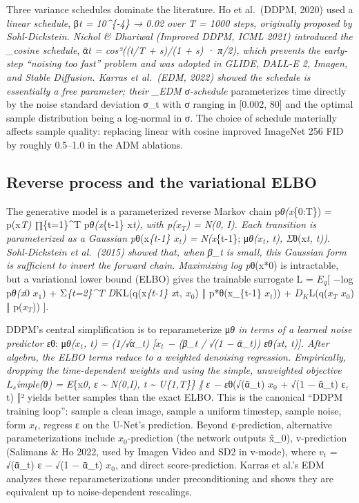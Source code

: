 Three variance schedules dominate the literature. Ho et al.~(DDPM, 2020) used a \emph{linear schedule}, β\emph{t = 10\^{}\{-4\} → 0.02 over T = 1000 steps, originally proposed by Sohl-Dickstein. Nichol \& Dhariwal (Improved DDPM, ICML 2021) introduced the \_cosine schedule}, ᾱ\emph{t = cos²((t/T + s)/(1 + s) · π/2), which prevents the early-step ``noising too fast'' problem and was adopted in GLIDE, DALL-E 2, Imagen, and Stable Diffusion. Karras et al.~(EDM, 2022) showed the schedule is essentially a free parameter; their \_EDM σ-schedule} parameterizes time directly by the noise standard deviation σ\_t with σ ranging in {[}0.002, 80{]} and the optimal sample distribution being a log-normal in σ. The choice of schedule materially affects sample quality: replacing linear with cosine improved ImageNet 256 FID by roughly 0.5--1.0 in the ADM ablations.

\subsection{Reverse process and the variational ELBO}\label{reverse-process-and-the-variational-elbo}

The generative model is a parameterized reverse Markov chain p\emph{θ(x}\{0:T\}) = p(x\emph{T) ∏}\{t=1\}\^{}T p\emph{θ(x}\{t-1\} \textbar{} x\emph{t), with p(\(x_T\)) = N(0, I). Each transition is parameterized as a Gaussian p}θ(x\emph{\{t-1\} \textbar{} \(x_t\)) = N(x}\{t-1\}; μ\emph{θ(\(x_t\), t), Σ}θ(x\emph{t, t)). Sohl-Dickstein et al.~(2015) showed that, when β\_t is small, this Gaussian form is sufficient to invert the forward chain. Maximizing log p}θ(x*0) is intractable, but a variational lower bound (ELBO) gives the trainable surrogate L = \(E_q\){[} −log p\emph{θ(x}0 \textbar{} \(x_1\)) + Σ\emph{\{t=2\}\^{}T D}KL(q(x\emph{\{t-1\} \textbar{} x}t, \(x_0\)) ‖ p*θ(x\_\{t-1\} \textbar{} \(x_t\))) + \(D_K\)L(q(\(x_T\) \textbar{} \(x_0\)) ‖ p(\(x_T\))) {]}.

DDPM's central simplification is to reparameterize μ\emph{θ in terms of a learned noise predictor ε}θ: μ\emph{θ(\(x_t\), t) = (1/√α\_t) {[}\(x_t\) − (β\_t / √(1 − ᾱ\_t)) ε\emph{θ(x}t, t){]}. After algebra, the ELBO terms reduce to a weighted denoising regression. Empirically, dropping the time-dependent weights and using the simple, unweighted objective \(L_s\)imple(θ) = E}\{x\emph{0, ε \textasciitilde{} N(0,I), t \textasciitilde{} U\{1,T\}\} ‖ ε − ε}θ(√(ᾱ\_t) \(x_0\) + √(1 − ᾱ\_t) ε, t) ‖² yields better samples than the exact ELBO. This is the canonical ``DDPM training loop'': sample a clean image, sample a uniform timestep, sample noise, form \(x_t\), regress ε on the U-Net's prediction. Beyond ε-prediction, alternative parameterizations include \(x_0\)-prediction (the network outputs x̂\_0), v-prediction (Salimans \& Ho 2022, used by Imagen Video and SD2 in v-mode), where \(v_t\) = √(ᾱ\_t) ε − √(1 − ᾱ\_t) \(x_0\), and direct score-prediction. Karras et al.'s EDM analyzes these reparameterizations under preconditioning and shows they are equivalent up to noise-dependent rescalings.

